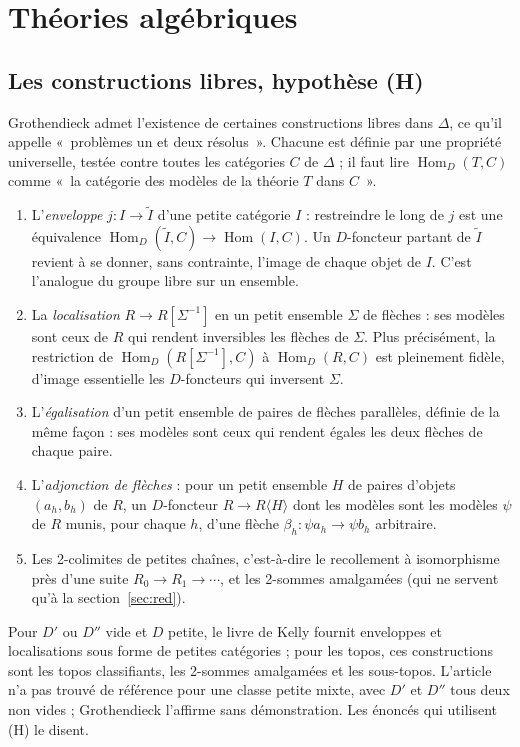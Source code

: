 \documentclass[11pt,a4paper]{amsart}
\theoremstyle{definition}
\theoremstyle{plain}
\theoremstyle{remark}
\newcommand{\Hom}{\operatorname{Hom}}
\newcommand{\It}{\widetilde I}
\begin{document}
\section{Théories algébriques}

\subsection{Les constructions libres, hypothèse (H)}

Grothendieck admet l'existence de certaines constructions libres dans $\Delta$, ce qu'il appelle «~problèmes un et deux résolus~». Chacune est définie par une propriété universelle, testée contre toutes les catégories $C$ de $\Delta$ ; il faut lire $\Hom_D(T,C)$ comme «~la catégorie des modèles de la théorie $T$ dans $C$~».
\begin{enumerate}
\item L'\emph{enveloppe} $j\colon I\to\It$ d'une petite catégorie $I$ : restreindre le long de $j$ est une équivalence $\Hom_D(\It,C)\to\Hom(I,C)$. Un $D$-foncteur partant de $\It$ revient à se donner, sans contrainte, l'image de chaque objet de $I$. C'est l'analogue du groupe libre sur un ensemble.
\item La \emph{localisation} $R\to R[\Sigma^{-1}]$ en un petit ensemble $\Sigma$ de flèches : ses modèles sont ceux de $R$ qui rendent inversibles les flèches de $\Sigma$. Plus précisément, la restriction de $\Hom_D(R[\Sigma^{-1}],C)$ à $\Hom_D(R,C)$ est pleinement fidèle, d'image essentielle les $D$-foncteurs qui inversent $\Sigma$.
\item L'\emph{égalisation} d'un petit ensemble de paires de flèches parallèles, définie de la même façon : ses modèles sont ceux qui rendent égales les deux flèches de chaque paire.
\item L'\emph{adjonction de flèches} : pour un petit ensemble $H$ de paires d'objets $(a_h,b_h)$ de $R$, un $D$-foncteur $R\to R\langle H\rangle$ dont les modèles sont les modèles $\psi$ de $R$ munis, pour chaque $h$, d'une flèche $\beta_h\colon\psi a_h\to\psi b_h$ arbitraire.
\item Les 2-colimites de petites chaînes, c'est-à-dire le recollement à isomorphisme près d'une suite $R_0\to R_1\to\cdots$, et les 2-sommes amalgamées (qui ne servent qu'à la section~\ref{sec:red}).
\end{enumerate}

Pour $D'$ ou $D''$ vide et $D$ petite, le livre de Kelly fournit enveloppes et localisations sous forme de petites catégories ; pour les topos, ces constructions sont les topos classifiants, les 2-sommes amalgamées et les sous-topos. L'article n'a pas trouvé de référence pour une classe petite mixte, avec $D'$ et $D''$ tous deux non vides ; Grothendieck l'affirme sans démonstration. Les énoncés qui utilisent (H) le disent.
\end{document}
